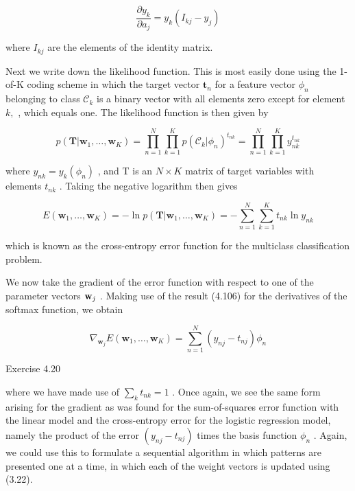 \documentclass[
  10
]{article}
\begin{document}
\[
\frac {\partial y _ {k}}{\partial a _ {j}} = y _ {k} (I _ {k j} - y _ {j})\tag{4.106}
\]

where \(I _ { k j }\) are the elements of the identity matrix.

Next we write down the likelihood function. This is most easily done
using the 1-of-K coding scheme in which the target vector
\(\mathbf { t } _ { n }\) for a feature vector \(\phi _ { n }\)
belonging to class \(\mathcal { C } _ { k }\) is a binary vector with
all elements zero except for element \(k ,\) , which equals one. The
likelihood function is then given by

\[
p (\mathbf {T} | \mathbf {w} _ {1}, \dots , \mathbf {w} _ {K}) = \prod_ {n = 1} ^ {N} \prod_ {k = 1} ^ {K} p (\mathcal {C} _ {k} | \phi_ {n}) ^ {t _ {n k}} = \prod_ {n = 1} ^ {N} \prod_ {k = 1} ^ {K} y _ {n k} ^ {t _ {n k}}\tag{4.107}
\]

where \(y _ { n k } = y _ { k } ( \phi _ { n } )\) , and T is an
\(N \times K\) matrix of target variables with elements \(t _ { n k }\)
. Taking the negative logarithm then gives

\[
E (\mathbf {w} _ {1}, \ldots , \mathbf {w} _ {K}) = - \ln p (\mathbf {T} | \mathbf {w} _ {1}, \ldots , \mathbf {w} _ {K}) = - \sum_ {n = 1} ^ {N} \sum_ {k = 1} ^ {K} t _ {n k} \ln y _ {n k}\tag{4.108}
\]

which is known as the cross-entropy error function for the multiclass
classification problem.

We now take the gradient of the error function with respect to one of
the parameter vectors \({ \bf w } _ { j }\) . Making use of the result
(4.106) for the derivatives of the softmax function, we obtain

\[
\nabla_ {\mathbf {w} _ {j}} E (\mathbf {w} _ {1}, \ldots , \mathbf {w} _ {K}) = \sum_ {n = 1} ^ {N} (y _ {n j} - t _ {n j}) \phi_ {n}\tag{4.109}
\]

Exercise 4.20

where we have made use of \(\textstyle \sum _ { k } t _ { n k } = 1\) .
Once again, we see the same form arising for the gradient as was found
for the sum-of-squares error function with the linear model and the
cross-entropy error for the logistic regression model, namely the
product of the error \(( y _ { n j } - t _ { n j } )\) times the basis
function \(\phi _ { n }\) . Again, we could use this to formulate a
sequential algorithm in which patterns are presented one at a time, in
which each of the weight vectors is updated using (3.22).
\end{document}
